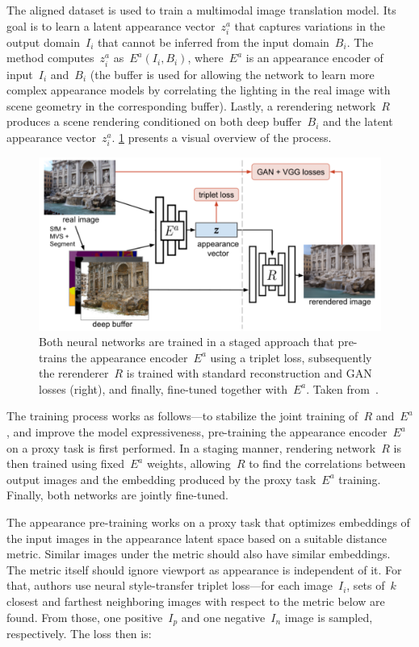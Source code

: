 The aligned dataset is used to train a multimodal image translation model. Its goal is to learn
a latent appearance vector~$z^a_i$ that captures variations in the output domain~$I_i$ that cannot be
inferred from the input domain~$B_i$. The method computes~$z^a_i$ as~$E^a(I_i, B_i)$, where~$E^a$ is
an appearance encoder of input~$I_i$ and~$B_i$ (the buffer is used for allowing the network to learn
more complex appearance models by correlating the lighting in the real image with scene geometry in the
corresponding buffer). Lastly, a rerendering network~$R$ produces a scene rendering conditioned
on both deep buffer~$B_i$ and the latent appearance vector~$z^a_i$. \cref{fig:nriw} presents a visual
overview of the process.

\begin{figure}
    \centering
    \includegraphics[width=.9\textwidth]{../graphics/nriw.png}
    \caption[NRIW model training]{Both neural networks are trained in a staged approach
    that pre-trains the appearance encoder~$E^a$ using a triplet loss, subsequently the
    rerenderer~$R$ is trained with standard reconstruction and GAN losses (right), and
    finally, fine-tuned together with~$E^a$. Taken from~\citet{NRIW}.}\label{fig:nriw}
\end{figure}

The training process works as follows---to stabilize the joint training of~$R$ and~$E^a$, and improve
the model expressiveness, pre-training the appearance encoder~$E^a$ on a proxy task is first performed.
In a staging manner, rendering network~$R$ is then trained using fixed~$E^a$ weights, allowing~$R$ to
find the correlations between output images and the embedding produced by the proxy task~$E^a$ training.
Finally, both networks are jointly fine-tuned.

The appearance pre-training works on a proxy task that optimizes
embeddings of the input images in the appearance latent space based on a suitable distance metric. Similar images under the metric should also have similar embeddings. The metric itself should ignore viewport as appearance is independent of it.
For that, authors use neural style-transfer triplet loss---for each image~$I_i$, sets of~$k$ closest and
farthest neighboring images with respect to the metric below are found. From those, one positive~$I_p$
and one negative~$I_n$ image is sampled, respectively. The loss then is:

